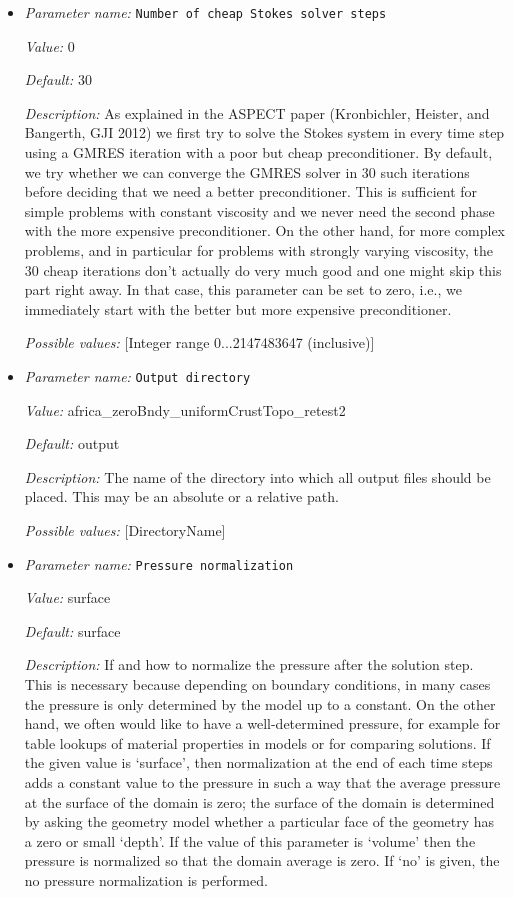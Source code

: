\begin{itemize}
{\it Possible values:} [Double 0...1 (inclusive)]
\item {\it Parameter name:} {\tt Number of cheap Stokes solver steps}


{\it Value:} 0


{\it Default:} 30


{\it Description:} As explained in the ASPECT paper (Kronbichler, Heister, and Bangerth, GJI 2012) we first try to solve the Stokes system in every time step using a GMRES iteration with a poor but cheap preconditioner. By default, we try whether we can converge the GMRES solver in 30 such iterations before deciding that we need a better preconditioner. This is sufficient for simple problems with constant viscosity and we never need the second phase with the more expensive preconditioner. On the other hand, for more complex problems, and in particular for problems with strongly varying viscosity, the 30 cheap iterations don't actually do very much good and one might skip this part right away. In that case, this parameter can be set to zero, i.e., we immediately start with the better but more expensive preconditioner.


{\it Possible values:} [Integer range 0...2147483647 (inclusive)]
\item {\it Parameter name:} {\tt Output directory}


{\it Value:} africa_zeroBndy_uniformCrustTopo_retest2


{\it Default:} output


{\it Description:} The name of the directory into which all output files should be placed. This may be an absolute or a relative path.


{\it Possible values:} [DirectoryName]
\item {\it Parameter name:} {\tt Pressure normalization}


{\it Value:} surface


{\it Default:} surface


{\it Description:} If and how to normalize the pressure after the solution step. This is necessary because depending on boundary conditions, in many cases the pressure is only determined by the model up to a constant. On the other hand, we often would like to have a well-determined pressure, for example for table lookups of material properties in models or for comparing solutions. If the given value is `surface', then normalization at the end of each time steps adds a constant value to the pressure in such a way that the average pressure at the surface of the domain is zero; the surface of the domain is determined by asking the geometry model whether a particular face of the geometry has a zero or small `depth'. If the value of this parameter is `volume' then the pressure is normalized so that the domain average is zero. If `no' is given, the no pressure normalization is performed.



\end{itemize}
